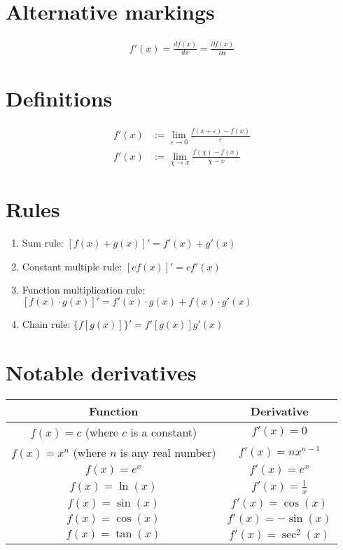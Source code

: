 \documentclass{article}
\begin{document}
\section*{Alternative markings}

\begin{align*}
	f'(x) = \frac{d f(x)}{d x} = \frac{\partial f(x)}{\partial x}
\end{align*}

\section*{Definitions}

\begin{align*}
	f'(x) &:= \lim_{\varepsilon \rightarrow 0} \frac{f(x+\varepsilon) - f(x)}{\varepsilon}\\
	f'(x) &:= \lim_{\chi \rightarrow x} \frac{f(\chi) - f(x)}{\chi - x}
\end{align*}

\section*{Rules}

\begin{enumerate}
\item Sum rule: $[f(x)+g(x)]' = f'(x) + g'(x)$
\item Constant multiple rule: $[cf(x)]' = c f'(x)$
\item Function multiplication rule: $ [f(x) \cdot g(x)]' = f'(x)\cdot g(x) + f(x) \cdot g'(x)$
\item Chain rule: $\{f[g(x)]\}' = f'[g(x)]g'(x)$
\end{enumerate}

\section*{Notable derivatives}

\begin{tabular}{|c|c|}
\hline
Function & Derivative \\
\hline
$f(x) = c$ (where $c$ is a constant) & $f'(x) = 0$ \\
\hline
$f(x) = x^n$ (where $n$ is any real number) & $f'(x) = nx^{n-1}$ \\
\hline
$f(x) = e^x$ & $f'(x) = e^x$ \\
\hline
$f(x) = \ln(x)$ & $f'(x) = \frac{1}{x}$ \\
\hline
$f(x) = \sin(x)$ & $f'(x) = \cos(x)$ \\
\hline
$f(x) = \cos(x)$ & $f'(x) = -\sin(x)$ \\
\hline
$f(x) = \tan(x)$ & $f'(x) = \sec^2(x)$ \\
\hline
\end{tabular}
\end{document}

